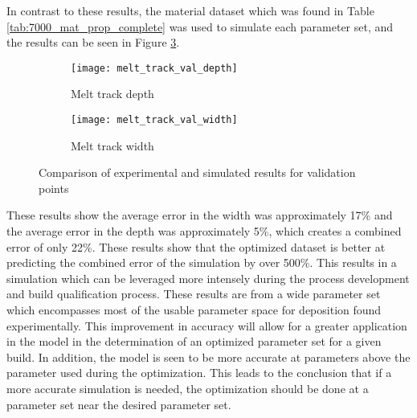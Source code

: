 In contrast to these results, the material dataset which was found in Table \ref{tab:7000_mat_prop_complete} was used to simulate each parameter set, and the results can be seen in Figure \ref{fig:melt_track_val}.
\begin{figure}[!htb]\centering
	\begin{subfigure}[c]{0.45\textwidth}\centering
	\texttt{[image: melt\_track\_val\_depth]}
	\caption{Melt track depth}
	\label{fig:melt_track_val_depth}
	\end{subfigure}\hfill{}
		\begin{subfigure}[c]{0.45\textwidth}\centering
		\texttt{[image: melt\_track\_val\_width]}
		\caption{Melt track width}
		\label{fig:melt_track_val_width}
		\end{subfigure}
	\caption{Comparison of experimental and simulated results for validation points}
	\label{fig:melt_track_val}
\end{figure}
These results show the average error in the width was approximately 17\% and the average error in the depth was approximately 5\%, which creates a combined error of only 22\%.  These results show that the optimized dataset is better at predicting the combined error of the simulation by over 500\%.  This results in a simulation which can be leveraged more intensely during the process development and build qualification process.  
These results are from a wide parameter set which encompasses most of the usable parameter space for deposition found experimentally.  This improvement in accuracy will allow for a greater application in the model in the determination of an optimized parameter set for a given build.  In addition, the model is seen to be more accurate at parameters above the parameter used during the optimization.  This leads to the conclusion that if a more accurate simulation is needed, the optimization should be done at a parameter set near the desired parameter set.